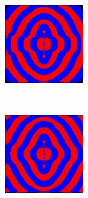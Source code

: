 \begin{figure}[p]
\bigskip
        \begin{subfigure}[b]{0.3\textwidth}
        \includegraphics[width=\textwidth]{include/graphics/pml-on-3}
    \end{subfigure}
    ~
    \begin{subfigure}[b]{0.3\textwidth}
        \includegraphics[width=\textwidth]{include/graphics/pml-on-4}

\end{subfigure}
\end{figure}
